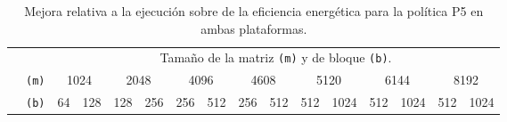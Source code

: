 \begin{table}
  \centering
  \caption[Mejora eficiencia energética para la política P5]{Mejora relativa a la ejecución sobre \botlev de la eficiencia energética para la política P5 en ambas plataformas.}
  \label{tab:mejora-gflopsw-p5}
  {\scriptsize
    \begin{tabular}{lccccccccccccccc}
      \toprule
  \multicolumn{2}{c}{\phantom{a}} & \multicolumn{14}{c}{Tamaño de la matriz \texttt{(m)} y
                                        de bloque \texttt{(b)}.} \\ \cmidrule{2-16}
      \phantom{4} & \texttt{(m)} & \multicolumn{2}{c}{1024} & \multicolumn{2}{c}{2048} &                                                                         \multicolumn{2}{c}{4096} & \multicolumn{2}{c}{4608} & \multicolumn{2}{c}{5120} & \multicolumn{2}{c}{6144} & \multicolumn{2}{c}{8192} \\
      \phantom{a} & \texttt{(b)} & 64 & 128 & 128 & 256 & 256 & 512 & 256 & 512 & 512 & 1024 & 512 & 1024 & 512 & 1024 \\ \hline




\end{tabular}}
\end{table}
